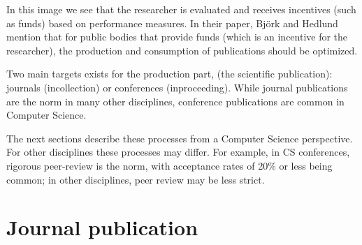 \documentclass{ou-report}
\newcommand{\todo}[1]{{\color{red} TODO: #1}}
\newcommand{\outline}[1]{{\color{blue} #1}}
\begin{document}
In this image we see that the researcher is evaluated and receives incentives 
(such as funds) based on performance measures. In their paper,  Bj\"ork and 
Hedlund mention that for public bodies that provide funds (which is an incentive 
for the researcher), the production and consumption of publications should be 
optimized.
    


Two main targets exists for the production part, (the scientific publication): 
journals (incollection) or 
conferences (inproceeding). While journal publications are the norm in many 
other disciplines, conference publications are common in Computer Science.

The next sections describe these processes from a Computer Science perspective. 
For other disciplines these processes may differ. For example, in CS 
conferences, rigorous peer-review is the norm, with acceptance rates of 20\% or 
less being common; in other disciplines, peer review may be less strict.
    


\section{Journal publication}
\end{document}
